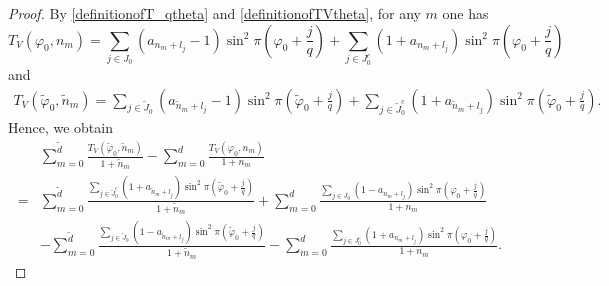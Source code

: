 \documentclass[12pt]{amsart}
\theoremstyle{plain}
\theoremstyle{definition}
\begin{document}
\begin{proof}
By \eqref{definitionofT_qtheta} and \eqref{definitionofTVtheta}, for any $m$ one has 
\begin{equation}
T_V(\varphi_0,n_m)
	=\sum_{j\in J_0}\left(a_{n_m+l_j}-1\right)\sin^2\pi\left(\varphi_0+\frac{j}{q}\right)+\sum_{j\in J_0^c}\left(1+a_{n_m+l_j}\right)\sin^2\pi\left(\varphi_0+\frac{j}{q}\right)\label{TVexpansion}
\end{equation}
and
\begin{align}
	T_V(\tilde{\varphi}_0,\tilde{n}_m)
	=\sum_{j\in \tilde{J}_0}(a_{\tilde{n}_m+l_j}-1)\sin^2\pi\left(\tilde{\varphi}_0+\frac{j}{q}\right)+\sum_{j\in \tilde{J}_0^c}(1+a_{\tilde{n}_m+l_j})\sin^2\pi\left(\tilde{\varphi}_0+\frac{j}{q}\right).\label{TVtildeexpansion}
\end{align}
Hence, we obtain
\begin{align}
	&\sum_{m=0}^{\tilde{d}}\frac{T_V(\tilde{\varphi}_0,\tilde{n}_{m})}{1+\tilde{n}_{m}}-\sum_{m=0}^{d}\frac{T_V(\varphi_0,n_{m})}{1+n_{m}}\nonumber\\
	=&\sum_{m=0}^{\tilde{d}}\frac{\sum_{j\in \tilde{J}_0^c}(1+a_{\tilde{n}_m+l_j})\sin^2\pi\left(\tilde{\varphi}_0+\frac{j}{q}\right)}{1+\tilde{n}_{m}}+\sum_{m=0}^{d}\frac{\sum_{j\in J_0}\left(1-a_{n_m+l_j}\right)\sin^2\pi\left(\varphi_0+\frac{j}{q}\right)}{1+n_{m}}\nonumber\\
	&-\sum_{m=0}^{\tilde{d}}\frac{\sum_{j\in \tilde{J}_0}(1-a_{\tilde{n}_m+l_j})\sin^2\pi\left(\tilde{\varphi}_0+\frac{j}{q}\right)}{1+\tilde{n}_{m}}-\sum_{m=0}^{d}\frac{\sum_{j\in J_0^c}\left(1+a_{n_m+l_j}\right)\sin^2\pi\left(\varphi_0+\frac{j}{q}\right)}{1+n_{m}}.\nonumber
\end{align}


\end{proof}
\end{document}
